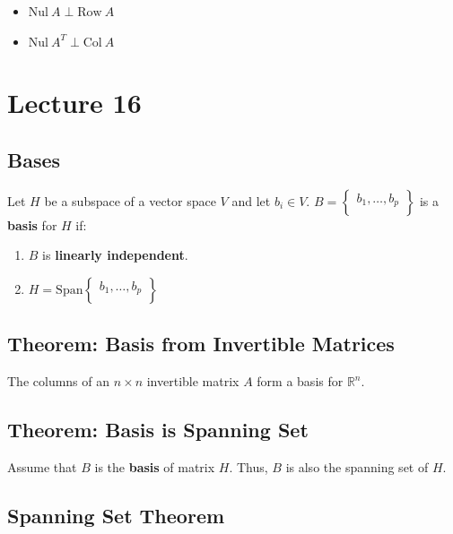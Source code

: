 \documentclass[12pt, letterpaper]{article}
\begin{document}
\begin{itemize}
  \item $ \textrm{Nul} \: A \perp \textrm{Row} \: A $
  \item $ \textrm{Nul} \: A^T \perp \textrm{Col} \: A $
\end{itemize}

\section*{Lecture 16}

\subsection*{Bases}

Let $ H $ be a subspace of a vector space $ V $ and let $ b_i \in V $. $ B =
\begin{Bmatrix}
  b_1, \hdots, b_p \\
\end{Bmatrix} $ is a \textbf{basis} for $ H $ if:

\begin{enumerate}
  \item $ B $ is \textbf{linearly independent}.
  \item $ H = \textrm{Span}
    \begin{Bmatrix}
      b_1, \hdots, b_p \\
    \end{Bmatrix} $
\end{enumerate}

\subsection*{Theorem: Basis from Invertible Matrices}

The columns of an $ n \times n $ invertible matrix $ A $ form a basis
for $ \mathbb{R}^n $.

\subsection*{Theorem: Basis is Spanning Set}

Assume that $ B $ is the \textbf{basis} of matrix $ H $. Thus, $ B $
is also the spanning set of $ H $.

\subsection*{Spanning Set Theorem}
\end{document}
